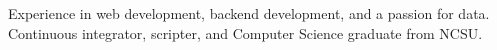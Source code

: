 
\begin{cvparagraph}
Experience in web development, backend development, and a passion for data. Continuous integrator, scripter, and Computer Science graduate from NCSU.
\end{cvparagraph}